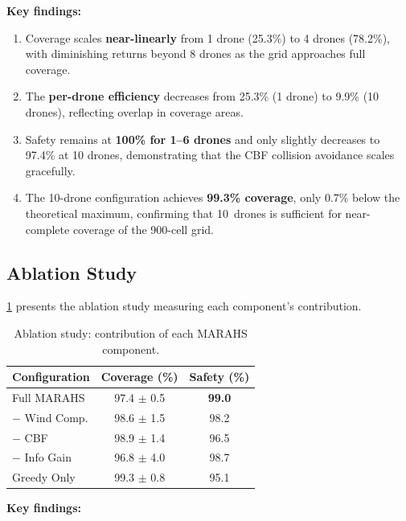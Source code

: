 \documentclass[11pt,twocolumn]{article}
\providecommand{\Cref}[1]{\ref{#1}}
\theoremstyle{definition}
\begin{document}
\textbf{Key findings:}

\begin{enumerate}[leftmargin=*]
    \item Coverage scales \textbf{near-linearly} from 1 drone (25.3\%) to 4 drones (78.2\%), with diminishing returns beyond 8 drones as the grid approaches full coverage.
    
    \item The \textbf{per-drone efficiency} decreases from 25.3\% (1 drone) to 9.9\% (10 drones), reflecting overlap in coverage areas.
    
    \item Safety remains at \textbf{100\% for 1--6 drones} and only slightly decreases to 97.4\% at 10 drones, demonstrating that the CBF collision avoidance scales gracefully.
    
    \item The 10-drone configuration achieves \textbf{99.3\% coverage}, only 0.7\% below the theoretical maximum, confirming that 10~drones is sufficient for near-complete coverage of the 900-cell grid.
\end{enumerate}

\subsection{Ablation Study}
\label{sec:ablation}

\Cref{tab:ablation} presents the ablation study measuring each component's contribution.

\begin{table}[t]
\centering
\caption{Ablation study: contribution of each MARAHS component.}
\label{tab:ablation}
\small
\begin{tabular}{lcc}
\toprule
\textbf{Configuration} & \textbf{Coverage (\%)} & \textbf{Safety (\%)} \\
\midrule
Full MARAHS       & 97.4 $\pm$ 0.5 & \textbf{99.0} \\
$-$ Wind Comp.    & 98.6 $\pm$ 1.5 & 98.2 \\
$-$ CBF           & 98.9 $\pm$ 1.4 & 96.5 \\
$-$ Info Gain     & 96.8 $\pm$ 4.0 & 98.7 \\
Greedy Only       & 99.3 $\pm$ 0.8 & 95.1 \\
\bottomrule
\end{tabular}
\end{table}

\textbf{Key findings:}
\end{document}
